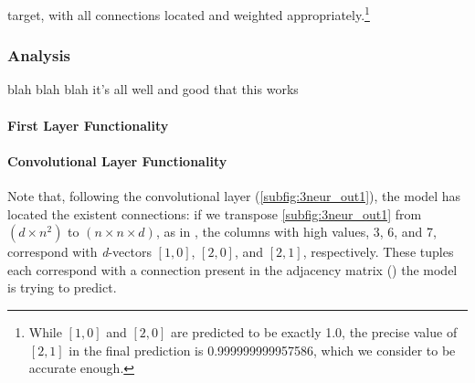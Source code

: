 target, with all connections located and weighted appropriately.\footnote{While 
	$[1,0]$ and $[2,0]$ are predicted to be exactly 1.0, the precise value of 
	$[2,1]$ in the final prediction is 0.999999999957586, which we consider to 
be accurate enough.}
\subsubsection{Analysis}
blah blah blah it's all well and good that this works

\paragraph{First Layer Functionality}

\paragraph{Convolutional Layer Functionality}

Note that, following the convolutional layer (\ref{subfig:3neur_out1}), the 
model has located the existent connections: if we transpose 
\ref{subfig:3neur_out1} from $(d \times n^2)$ to $(n \times n \times d)$, as in 
, the columns with high values, 3, 6, and 7, correspond 
with \textit{d}-vectors $[1,0]$, $[2,0]$, and $[2,1]$, respectively. These 
tuples each correspond with a connection present in the adjacency matrix 
() the model is trying to predict. 

